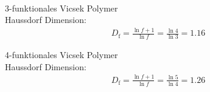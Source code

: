 \documentclass[final]{beamer}
\newlength{\columnheight}
\newlength{\marginw}
\newlength{\tw}
\newlength{\colw}
\newenvironment{myTwoColPoster}{%
  \begin{minipage}[t]{\textwidth}%
    \hspace*{\marginw}%
    \hspace*{9.5bp}%
    \begin{minipage}[t]{\tw}}%
  {\end{minipage}%
   \hspace*{\marginw}%
   \end{minipage}}
\newenvironment{myCol}%
    {\begin{minipage}[t][\columnheight][t]{\colw}}%
    {\end{minipage}}
\begin{document}
\begin{frame}[t]{}
\begin{myTwoColPoster}
\begin{myCol}
  \begin{minipage}[c]{0.48\textwidth}
    {}\\
    3-funktionales Vicsek Polymer\\
    Haussdorf Dimension:
    \begin{align*}
      D_\text{f}=\frac{\ln{f+1}}{\ln{f}} = \frac{\ln{4}}{\ln{3}} = 1.16
    \end{align*}
  \end{minipage}
  \hfill
  \begin{minipage}[c]{0.48\textwidth}
    4-funktionales Vicsek Polymer\\
    Haussdorf Dimension:
    \begin{align*}
      D_\text{f}=\frac{\ln{f+1}}{\ln{f}} = \frac{\ln{5}}{\ln{4}} = 1.26
    \end{align*}
    \vspace*{4cm}

\end{minipage}
\end{myCol}
\end{myTwoColPoster}
\end{frame}
\end{document}
